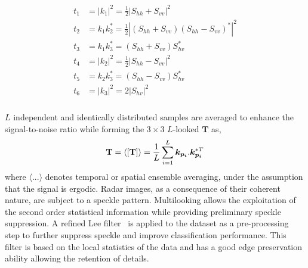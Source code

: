 \begin{align}
\begin{split}
\label{eqn:tmat}
t_1 &=  |k_1|^2   = \frac{1}{2} |S_{hh}+S_{vv}|^2 \\
t_2 &=  k_1k_2^*  = \frac{1}{2} |(S_{hh}+S_{vv})(S_{hh}-S_{vv})^*|^2 \\
t_3 &=  k_1k_3^*  =  (S_{hh}+S_{vv}) S_{hv}^*  \\
t_4 &=  |k_2|^2   = \frac{1}{2} |S_{hh}-S_{vv}|^2 \\
t_5 &=  k_2k_3^*   =  (S_{hh}-S_{vv}) S_{hv}^*  \\
t_6 &=  |k_3|^2   = 2 |S_{hv}|^2  \\
\end{split}
\end{align}



$L$ independent and identically distributed samples are averaged to enhance the signal-to-noise ratio while forming the $3\times3$  $L$-looked $\mathbf{T}$ as,
\begin{equation}
\mathbf{T} =  \langle \mathbf{[T]} \rangle = \frac{1}{L} \sum_{i=1}^{L} \bm{k_{p_i}}.\bm{k_{p_i}}^{*\small T} 
\end{equation}
where $\langle ... \rangle$ denotes temporal or spatial ensemble averaging, under the assumption that the signal is ergodic. 
Radar images, as a consequence of their coherent nature, are subject to a speckle pattern. Multilooking allows the exploitation of the second order statistical information while providing preliminary speckle suppression. A refined Lee filter~\cite{lee1994speckle} is applied to the dataset as a pre-processing step to further suppress speckle and improve classification performance. This filter is based on the local statistics of the data and has a good edge preservation ability allowing the retention of details.

